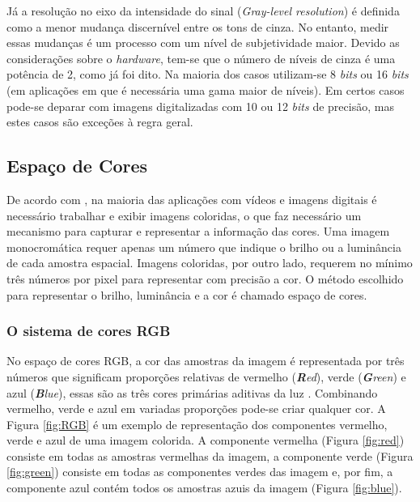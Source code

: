  Já a resolução no eixo da intensidade do sinal (\textit{Gray-level resolution}) é definida como a menor mudança discernível entre os tons de cinza. No entanto, medir essas mudanças é um processo com um nível de subjetividade maior. Devido as considerações sobre o \textit{hardware}, tem-se que o número de níveis de cinza é uma potência de 2, como já foi dito. Na maioria dos casos utilizam-se 8 \textit{bits} ou 16 \textit{bits} (em aplicações em que é necessária uma gama maior de níveis). Em certos casos pode-se deparar com imagens digitalizadas com 10 ou 12 \textit{bits} de precisão, mas estes casos são exceções à regra geral.


\subsection{Espaço de Cores}

De acordo com \cite{richardson2011h}, na maioria das aplicações com vídeos e imagens digitais é necessário trabalhar e exibir imagens coloridas, o que faz necessário um mecanismo para capturar e representar a informação das cores. Uma imagem monocromática requer apenas um número que indique o brilho ou a luminância de cada amostra espacial. Imagens coloridas, por outro lado, requerem no mínimo três números por pixel para representar com precisão a cor. O método escolhido para representar o brilho, luminância e a cor é chamado espaço de cores.

\subsubsection{O sistema de cores RGB}

No espaço de cores RGB, a cor das amostras da imagem é representada por três números que significam proporções relativas de vermelho (\textit{\textbf{R}ed}), verde (\textit{\textbf{G}reen}) e azul (\textit{\textbf{B}lue}), essas são as três cores primárias aditivas da luz \cite{richardson2011h}.	Combinando vermelho, verde e azul em variadas proporções pode-se criar qualquer cor. A Figura \ref{fig:RGB} é um exemplo de representação dos componentes vermelho, verde e azul de uma imagem colorida. A componente vermelha (Figura \ref{fig:red}) consiste em todas as amostras vermelhas da imagem, a componente verde (Figura \ref{fig:green}) consiste em todas as componentes verdes das imagem e, por fim, a componente azul contém todos os amostras azuis da imagem (Figura \ref{fig:blue}).

